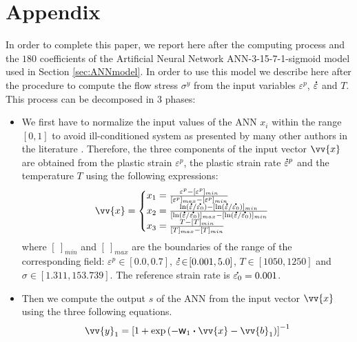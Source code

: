 \documentclass[twoside,english,1p,final,sort&compress]{elsarticle}
\theoremstyle{plain}
\DeclareRobustCommand{\w}{\mbox{\large\ensuremath{\mathsf{w}}}}
\DeclareRobustCommand{\dotp}{\boldsymbol{\cdot}}
\DeclareRobustCommand{\mdot}[1]{\accentset{\mbox{\bfseries .}}{#1}}
\renewcommand{\overrightarrow}{\vv}
\begin{document}



\section*{Appendix\label{sec:Appendix}}
In order to complete this paper, we report here after the computing process and the $180$ coefficients of the Artificial Neural Network ANN-3-15-7-1-sigmoid model used in Section \ref{sec:ANNmodel}.
In order to use this model we describe here after the procedure to compute the flow stress $\sigma^y$ from the input variables $\varepsilon^p$, $\mdot\varepsilon$ and $T$.
This process can be decomposed in $3$ phases:
\begin{itemize}
\item We first have to normalize the input values of the ANN $x_i$ within the range $[0,1]$ to avoid ill-conditioned system as presented by many other authors in the literature \cite{Lin-2008-ANN, Lu-2011-ANN}.
Therefore, the three components of the input vector $\overrightarrow{x}$ are obtained from the plastic strain $\varepsilon^p$, the plastic strain rate $\mdot{\varepsilon}^p$ and the temperature $T$ using the following expressions:
\begin{equation}
\overrightarrow{x}=
\begin{cases}
x_1 = \frac{\varepsilon^p - [\varepsilon^p]_{min}}{[\varepsilon^p]_{max} - [\varepsilon^p]_{min}}\\
x_2 = \frac{\ln(\mdot{\varepsilon}/\mdot{\varepsilon_0})-[\ln(\mdot{\varepsilon}/\mdot{\varepsilon_0})]_{min}}{[\ln(\mdot{\varepsilon}/\mdot{\varepsilon_0})]_{max}-[\ln(\mdot{\varepsilon}/\mdot{\varepsilon_0})]_{min}}\label{eq:CR1}\\
x_3 = \frac{T-[T]_{min}}{[T]_{max}-[T]_{min}}
\end{cases}
\end{equation}
where $[~]_{min}$ and $[~]_{max}$  are the boundaries of the range of the corresponding field: $\varepsilon^p\!\in\!\left[0.0,0.7\right]$, $\mdot{\varepsilon}\!\in\!\left[0.001,5.0\right]$, $T\!\in\!\left[1050,1250\right]$ and $\sigma\!\in\!\left[1.311,153.739\right]$.
The reference strain rate is $\mdot{\varepsilon_0} = 0.001$.
\item Then we compute the output $s$ of the ANN from the input vector $\overrightarrow{x}$ using the three following equations.
\begin{equation}
\overrightarrow{y}_1 = \left[1 + \exp{\left(- \w_1 \dotp \overrightarrow{x}- \overrightarrow{b}_1\right)}\right]^{-1}

\end{equation}
\end{itemize}
\end{document}
